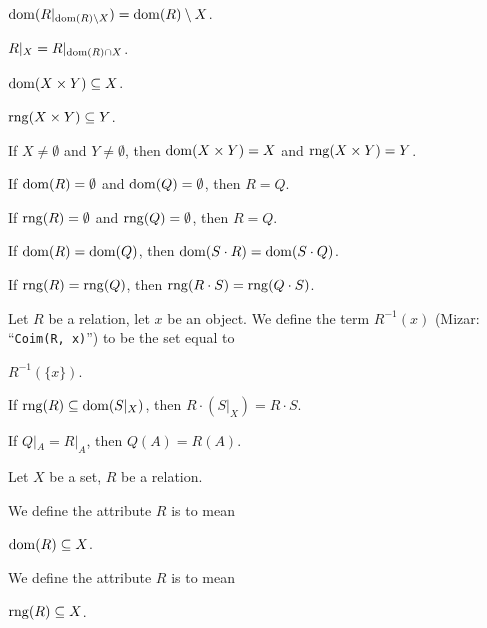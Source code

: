 \documentclass{article}
\begin{document}
\begin{thm}
\item\label{relat1:156} $\operatorname{dom}(R|_{\operatorname{dom}(R)\setminus X})=\operatorname{dom}(R)\setminus X$.
\item\label{relat1:157} $R|_{X}=R|_{\operatorname{dom}(R)\cap X}$.
\item\label{relat1:158} $\operatorname{dom}(X\times Y)\subseteq X$.
\item\label{relat1:159} $\operatorname{rng}(X\times Y)\subseteq Y$.
\item\label{relat1:160} If $X\neq\emptyset$ and $Y\neq\emptyset$,
  then $\operatorname{dom}(X\times Y)=X$ and $\operatorname{rng}(X\times Y)=Y$.
\item\label{relat1:161} If $\operatorname{dom}(R)=\emptyset$ and
  $\operatorname{dom}(Q)=\emptyset$, then $R=Q$.
\item\label{relat1:162}  If $\operatorname{rng}(R)=\emptyset$ and
  $\operatorname{rng}(Q)=\emptyset$, then $R=Q$.
\item\label{relat1:163} If $\operatorname{dom}(R)=\operatorname{dom}(Q)$, then $\operatorname{dom}(S\cdot R)=\operatorname{dom}(S\cdot Q)$.
\item\label{relat1:164} If $\operatorname{rng}(R)=\operatorname{rng}(Q)$, then $\operatorname{rng}(R\cdot S)=\operatorname{rng}(Q\cdot S)$.
\end{thm}

\begin{definition}
Let $R$ be a relation, let $x$ be an object.
We define the term $R^{-1}(x)$ (Mizar: ``\verb#Coim(R, x)#'') to be the
set equal to
\begin{defn}
\item $R^{-1}(\{x\})$.
\end{defn}
\end{definition}

\begin{thm}
\item\label{relat1:165} If $\operatorname{rng}(R)\subseteq\operatorname{dom}(S|_{X})$, then
  $R\cdot(S|_{X})=R\cdot S$.
\item\label{relat1:166} If $Q|_{A}=R|_{A}$, then $Q(A)=R(A)$.
\end{thm}

\begin{definition}
  Let $X$ be a set, $R$ be a relation.

  We define the attribute $R$ is  to mean
  \begin{defn}
  \item $\operatorname{dom}(R)\subseteq X$.
  \end{defn}
  We define the attribute $R$ is  to mean
  \begin{defn}
  \item $\operatorname{rng}(R)\subseteq X$.
  \end{defn}
\end{definition}
\end{document}
